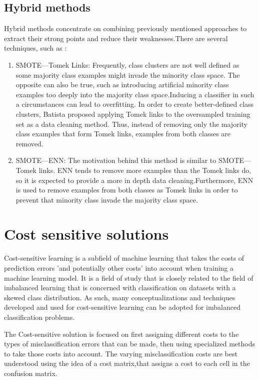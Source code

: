 \subsection{Hybrid methods}
Hybrid methods concentrate on combining previously mentioned approaches to extract their strong points and reduce their weaknesses.There are several techniques, such as : \\
\begin{enumerate}

\item {SMOTE—Tomek Links: Frequently, class clusters are not well defined as some majority class examples might invade the minority class space. The opposite can also be true, such as introducing artificial minority class examples too deeply into the majority class space.Inducing a classifier in such a circumstances can lead to overfitting. In order to create better-defined class clusters, Batista proposed applying Tomek links to the oversampled training set as a data cleaning method. Thus, instead of removing only the majority class examples that form Tomek links, examples from both classes are removed.} 

\item {SMOTE—ENN: The motivation behind this method is similar to SMOTE—Tomek links. ENN tends to remove more examples than the Tomek links do, so it is expected to provide a more in depth data cleaning.Furthermore, ENN is used to remove examples from both classes as Tomek links in order to prevent that minority class invade the majority class space. } \\
\end{enumerate}

\section{Cost sensitive solutions}
Cost-sensitive learning is a subfield of machine learning that takes the costs of prediction errors 'and potentially other costs' into account when training a machine learning model. It is a field of study that is closely related to the field of imbalanced learning that is concerned with classification on datasets with a skewed class distribution. As such, many conceptualizations and techniques developed and used for cost-sensitive learning can be adopted for imbalanced classification problems.

The Cost-sensitive solution is focused on first assigning different costs to the types of misclassification errors that can be made, then using specialized methods to take those costs into account.
The varying misclassification costs are best understood using the idea of a cost matrix,that assigns a cost to each cell in the confusion matrix. \\

